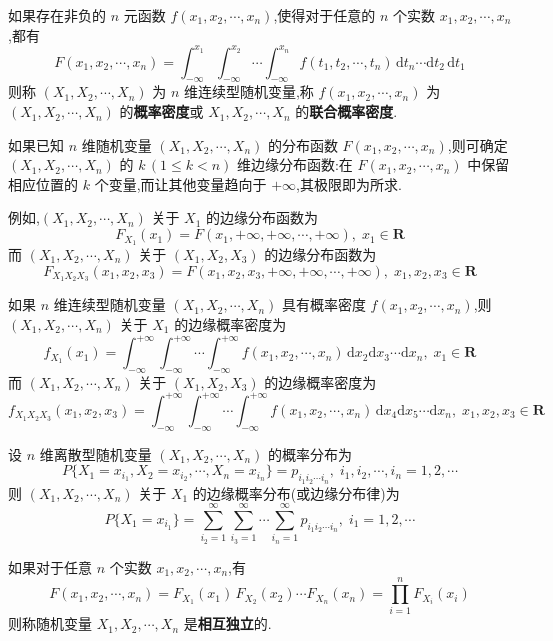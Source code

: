 \begin{definition}
    如果存在非负的 $n$ 元函数 $f(x_1,x_2,\cdots,x_n)$,使得对于任意的 $n$ 个实数 $x_1,x_2,\cdots,x_n$,都有
    $$
    F(x_1,x_2,\cdots,x_n) = \int_{-\infty}^{x_1} \int_{-\infty}^{x_2} \cdots \int_{-\infty}^{x_n} f(t_1,t_2,\cdots,t_n) \, \text{d}t_n \cdots \text{d}t_2 \, \text{d}t_1
    $$
    则称 $(X_1,X_2,\cdots,X_n)$ 为 $n$ 维连续型随机变量,称 $f(x_1,x_2,\cdots,x_n)$ 为 $(X_1,X_2,\cdots,X_n)$ 的\textbf{概率密度}或 $X_1,X_2,\cdots,X_n$ 的\textbf{联合概率密度}.
\end{definition}

\begin{conclusion}
    如果已知 $n$ 维随机变量 $(X_1,X_2,\cdots,X_n)$ 的分布函数 $F(x_1,x_2,\cdots,x_n)$,则可确定 $(X_1,X_2,\cdots,X_n)$ 的 $k \, (1 \leqslant k < n)$ 维边缘分布函数:在 $F(x_1,x_2,\cdots,x_n)$ 中保留相应位置的 $k$ 个变量,而让其他变量趋向于 $+\infty$,其极限即为所求. 
\end{conclusion}

例如,$(X_1,X_2,\cdots,X_n)$ 关于 $X_1$ 的边缘分布函数为
$$
F_{X_1}(x_1) = F(x_1, +\infty, +\infty, \cdots, +\infty), \; x_1 \in \mathbf{R}
$$
而 $(X_1,X_2,\cdots,X_n)$ 关于 $(X_1,X_2,X_3)$ 的边缘分布函数为
$$
F_{X_1 X_2 X_3}(x_1,x_2,x_3) = F(x_1, x_2, x_3, +\infty, +\infty, \cdots, +\infty), \; x_1,x_2,x_3 \in \mathbf{R}
$$

如果 $n$ 维连续型随机变量 $(X_1,X_2,\cdots,X_n)$ 具有概率密度 $f(x_1,x_2,\cdots,x_n)$,则 \\
$(X_1,X_2,\cdots,X_n)$ 关于 $X_1$ 的边缘概率密度为
$$
f_{X_1}(x_1) = \int_{-\infty}^{+\infty} \int_{-\infty}^{+\infty} \cdots \int_{-\infty}^{+\infty} f(x_1,x_2,\cdots,x_n) \, \text{d}x_2 \text{d}x_3 \cdots \text{d}x_n, \; x_1 \in \mathbf{R}
$$
而 $(X_1,X_2,\cdots,X_n)$ 关于 $(X_1,X_2,X_3)$ 的边缘概率密度为
$$
f_{X_1 X_2 X_3}(x_1,x_2,x_3) = \int_{-\infty}^{+\infty} \int_{-\infty}^{+\infty} \cdots \int_{-\infty}^{+\infty} f(x_1,x_2,\cdots,x_n) \, \text{d}x_4 \text{d}x_5 \cdots \text{d}x_n, \; x_1,x_2,x_3 \in \mathbf{R}
$$

设 $n$ 维离散型随机变量 $(X_1,X_2,\cdots,X_n)$ 的概率分布为
$$
P\{X_1 = x_{i_1}, X_2 = x_{i_2}, \cdots, X_n = x_{i_n}\} = p_{i_1 i_2 \cdots i_n}, \; i_1, i_2, \cdots, i_n = 1,2,\cdots
$$
则 $(X_1,X_2,\cdots,X_n)$ 关于 $X_1$ 的边缘概率分布(或边缘分布律)为
$$
P\{X_1=x_{i_1}\} = \sum_{i_2=1}^{\infty} \sum_{i_3=1}^{\infty} \cdots \sum_{i_n=1}^{\infty} p_{i_1 i_2 \cdots i_n}, \; i_1 = 1,2,\cdots
$$

\begin{definition}
    如果对于任意 $n$ 个实数 $x_1,x_2,\cdots,x_n$,有
    $$
    F(x_1,x_2,\cdots,x_n) = F_{X_1}(x_1) \, F_{X_2}(x_2) \cdots F_{X_n}(x_n) = \prod_{i=1}^n F_{X_i}(x_i)
    $$
    则称随机变量 $X_1,X_2,\cdots,X_n$ 是\textbf{相互独立}的.
\end{definition}

